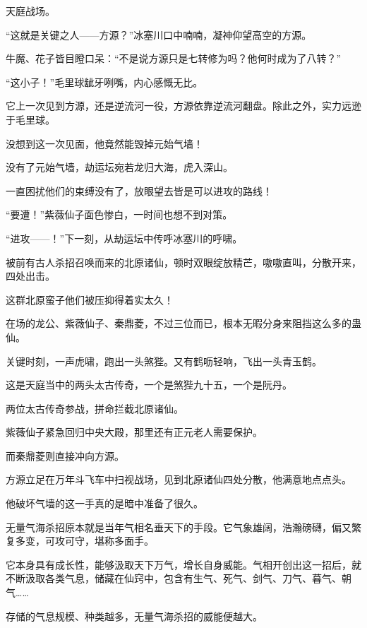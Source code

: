 
\begin{this_body}



天庭战场。

“这就是关键之人——方源？”冰塞川口中喃喃，凝神仰望高空的方源。

牛魔、花子皆目瞪口呆：“不是说方源只是七转修为吗？他何时成为了八转？”

“这小子！”毛里球龇牙咧嘴，内心感慨无比。

它上一次见到方源，还是逆流河一役，方源依靠逆流河翻盘。除此之外，实力远逊于毛里球。

没想到这一次见面，他竟然能毁掉元始气墙！

没有了元始气墙，劫运坛宛若龙归大海，虎入深山。

一直困扰他们的束缚没有了，放眼望去皆是可以进攻的路线！

“要遭！”紫薇仙子面色惨白，一时间也想不到对策。

“进攻——！”下一刻，从劫运坛中传呼冰塞川的呼啸。

被前有古人杀招召唤而来的北原诸仙，顿时双眼绽放精芒，嗷嗷直叫，分散开来，四处出击。

这群北原蛮子他们被压抑得着实太久！

在场的龙公、紫薇仙子、秦鼎菱，不过三位而已，根本无暇分身来阻挡这么多的蛊仙。

关键时刻，一声虎啸，跑出一头煞狴。又有鹤呖轻响，飞出一头青玉鹤。

这是天庭当中的两头太古传奇，一个是煞狴九十五，一个是阮丹。

两位太古传奇参战，拼命拦截北原诸仙。

紫薇仙子紧急回归中央大殿，那里还有正元老人需要保护。

而秦鼎菱则直接冲向方源。

方源立足在万年斗飞车中扫视战场，见到北原诸仙四处分散，他满意地点点头。

他破坏气墙的这一手真的是暗中准备了很久。

无量气海杀招原本就是当年气相名垂天下的手段。它气象雄阔，浩瀚磅礴，偏又繁复多变，可攻可守，堪称多面手。

它本身具有成长性，能够汲取天下万气，增长自身威能。气相开创出这一招后，就不断汲取各类气息，储藏在仙窍中，包含有生气、死气、剑气、刀气、暮气、朝气……

存储的气息规模、种类越多，无量气海杀招的威能便越大。


\end{this_body}
